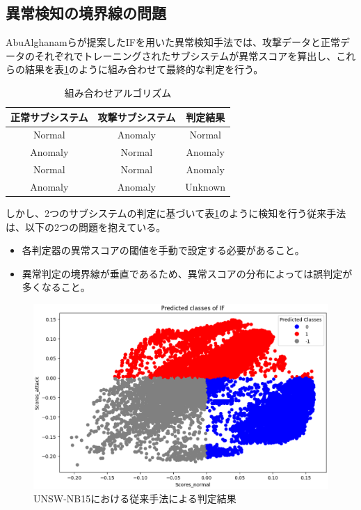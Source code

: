 \documentclass{css}
\begin{document}
\subsection{異常検知の境界線の問題}
AbuAlghanamらが提案したIFを用いた異常検知手法\cite{AbuAlghanam2023-sx}では、攻撃データと正常データのそれぞれでトレーニングされたサブシステムが異常スコアを算出し、これらの結果を表\ref{tab:combination}のように組み合わせて最終的な判定を行う。

\begin{table}[ht]
    \caption{組み合わせアルゴリズム}
    \centering
    \footnotesize
    \begin{tabular}{ccc}
        \hline\hline
        正常サブシステム & 攻撃サブシステム & 判定結果\\
        \hline
        Normal & Anomaly & Normal \\
        Anomaly & Normal & Anomaly \\
        Normal & Normal & Anomaly \\
        Anomaly & Anomaly & Unknown \\
        \hline
    \end{tabular}
    \label{tab:combination}
\end{table}

しかし、2つのサブシステムの判定に基づいて表\ref{tab:combination}のように検知を行う従来手法は、以下の2つの問題を抱えている。

\begin{itemize}
    \item 各判定器の異常スコアの閾値を手動で設定する必要があること。
    \item 異常判定の境界線が垂直であるため、異常スコアの分布によっては誤判定が多くなること。
\end{itemize}

\begin{figure}[ht]
    \centering
    \includegraphics[width=\linewidth]{pictures/eps/UNSW-NB152.eps}
    \caption{UNSW-NB15における従来手法による判定結果}
    \label{fig:UNSW-NB152}
\end{figure}
\end{document}
